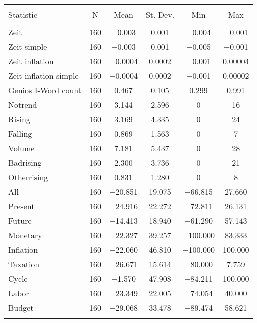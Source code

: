 
\begin{table}[!htbp] \centering 
  \caption{} 
  \label{} 
\begin{tabular}{@{\extracolsep{5pt}}lccccc} 
\\[-1.8ex]\hline 
\hline \\[-1.8ex] 
Statistic & \multicolumn{1}{c}{N} & \multicolumn{1}{c}{Mean} & \multicolumn{1}{c}{St. Dev.} & \multicolumn{1}{c}{Min} & \multicolumn{1}{c}{Max} \\ 
\hline \\[-1.8ex] 
Zeit  & 160 & $-$0.003 & 0.001 & $-$0.004 & $-$0.001 \\ 
Zeit simple & 160 & $-$0.003 & 0.001 & $-$0.005 & $-$0.001 \\ 
Zeit inflation & 160 & $-$0.0004 & 0.0002 & $-$0.001 & 0.00004 \\ 
Zeit inflation simple & 160 & $-$0.0004 & 0.0002 & $-$0.001 & 0.00002 \\ 
Genios I-Word count & 160 & 0.467 & 0.105 & 0.299 & 0.991 \\ 
Notrend & 160 & 3.144 & 2.596 & 0 & 16 \\ 
Rising & 160 & 3.169 & 4.335 & 0 & 24 \\ 
Falling & 160 & 0.869 & 1.563 & 0 & 7 \\ 
Volume & 160 & 7.181 & 5.437 & 0 & 28 \\ 
Badrising & 160 & 2.300 & 3.736 & 0 & 21 \\ 
Otherrising & 160 & 0.831 & 1.280 & 0 & 8 \\ 
All & 160 & $-$20.851 & 19.075 & $-$66.815 & 27.660 \\ 
Present & 160 & $-$24.916 & 22.272 & $-$72.811 & 26.131 \\ 
Future & 160 & $-$14.413 & 18.940 & $-$61.290 & 57.143 \\ 
Monetary & 160 & $-$22.327 & 39.257 & $-$100.000 & 83.333 \\ 
Inflation & 160 & $-$22.060 & 46.810 & $-$100.000 & 100.000 \\ 
Taxation & 160 & $-$26.671 & 15.614 & $-$80.000 & 7.759 \\ 
Cycle & 160 & $-$1.570 & 47.908 & $-$84.211 & 100.000 \\ 
Labor & 160 & $-$23.349 & 22.005 & $-$74.054 & 40.000 \\ 
Budget & 160 & $-$29.068 & 33.478 & $-$89.474 & 58.621 \\ 
\hline \\[-1.8ex] 
\end{tabular} 
\end{table} 
